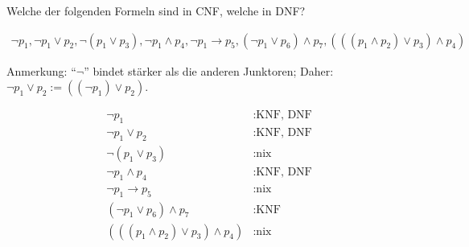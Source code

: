 
\begin{exercise}[30]

Welche der folgenden Formeln sind in CNF, welche in DNF?

\begin{align*}
    \neg p_1,
    \neg p_1 \lor p_2,
    \neg (p_1 \lor p_3),
    \neg p_1 \land p_4,
    \neg p_1 \to p_5,
    (\neg p_1 \lor p_6) \land p_7,
    (((p_1 \land p_2) \lor p_3) \land p_4)
\end{align*}

Anmerkung:
\enquote{$\neg$} bindet stärker als die anderen Junktoren;
Daher:
$\neg p_1 \lor p_2 := ((\neg p_1) \lor p_2)$.

\end{exercise}


\begin{solution}

\phantom{}


\begin{align*}
    \neg p_1 &: \text{KNF, DNF} \\
    \neg p_1 \lor p_2 &: \text{KNF, DNF} \\
    \neg (p_1 \lor p_3) &: \text{nix} \\
    \neg p_1 \land p_4 &: \text{KNF, DNF} \\
    \neg p_1 \to p_5 &: \text{nix} \\
    (\neg p_1 \lor p_6) \land p_7 &: \text{KNF} \\
    (((p_1 \land p_2) \lor p_3) \land p_4) &: \text{nix}
\end{align*}

\end{solution}

